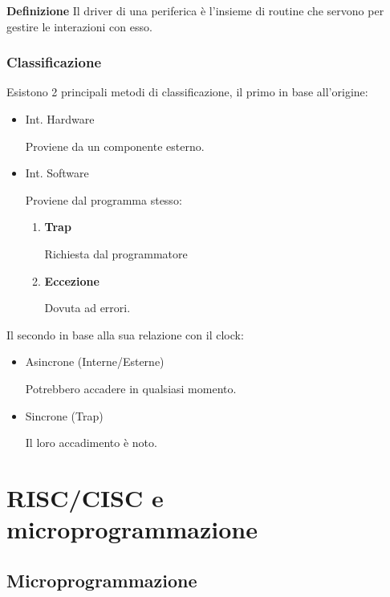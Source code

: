 \documentclass{article}
\begin{document}
\noindent\textbf{Definizione} Il driver di una periferica è l'insieme di routine che servono per gestire le interazioni con esso.\newline

\subsubsection{Classificazione}

\noindent Esistono 2 principali metodi di classificazione, il primo in base all'origine:
\begin{itemize}
    \item Int. Hardware

        Proviene da un componente esterno.
    
    \item Int. Software

        Proviene dal programma stesso:
        \begin{enumerate}
            \item \textbf{Trap}

                Richiesta dal programmatore

            \item \textbf{Eccezione}

                Dovuta ad errori.\newline
            
        \end{enumerate}
    
\end{itemize}

\noindent Il secondo in base alla sua relazione con il clock:
\begin{itemize}
    \item Asincrone (Interne/Esterne)

        Potrebbero accadere in qualsiasi momento.
    
    \item Sincrone (Trap)

        Il loro accadimento è noto.\newline
    
\end{itemize}

\section{RISC/CISC e microprogrammazione}

\subsection{Microprogrammazione}
\end{document}
